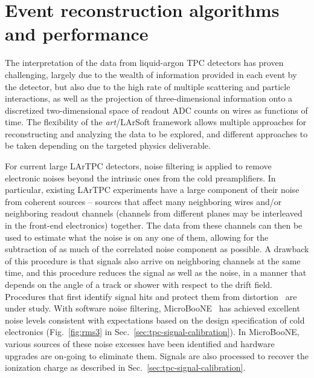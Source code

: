 \section{Event reconstruction algorithms and performance}
\label{sec:larsoftreco}

The interpretation of the data from liquid-argon TPC detectors has
proven challenging, largely due to the wealth of information provided
in each event by the detector, but also due to the high rate of
multiple scattering and particle interactions, as well as the
projection of three-dimensional information onto a discretized
two-dimensional space of readout ADC counts on wires as functions of
time.  The flexibility of the {\it{art}}/LArSoft framework allows
multiple approaches for reconstructing and analyzing the data to be
explored, and different approaches to be taken depending on the targeted
physics deliverable.


For current large LArTPC detectors, noise filtering is applied to remove
electronic noises beyond the intrinsic ones from the cold preamplifiers.
In particular, existing LArTPC experiments have a
large component of their noise from coherent sources -- sources that
affect many neighboring wires and/or neighboring readout channels
(channels from different planes may be interleaved in the front-end
electronics) together.  The data from these channels can then be used
to estimate what the noise is on any one of them, allowing for the subtraction of
as much of the correlated noise component as possible.  A
drawback of this procedure is that signals also arrive on neighboring
channels at the same time, and this procedure reduces the signal as
well as the noise, in a manner that depends on the angle of a track or
shower with respect to the drift field.  Procedures that first
identify signal hits and protect them from distortion~\cite{microboone_noise} 
are under study. With software noise filtering, MicroBooNE~\cite{noise_filter}
has achieved excellent noise levels consistent with expectations based on 
the design specification of cold electronics (Fig.~\ref{fig:rms3} 
in Sec.~\ref{sec:tpc-signal-calibration}).  In MicroBooNE, various 
sources of these noise excesses have been identified and hardware upgrades 
are on-going to eliminate them. 
Signals are also processed to recover the ionization charge
as described in Sec.~\ref{sec:tpc-signal-calibration}. 

